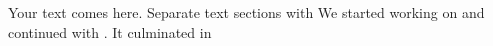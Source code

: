 Your text comes here. Separate text sections with
We started working on \cite{Schiendorfer13} and continued 
with \cite{knapp-schiendorfer2014ictai}. It culminated in
\cite{SchiendorferPvs2015}